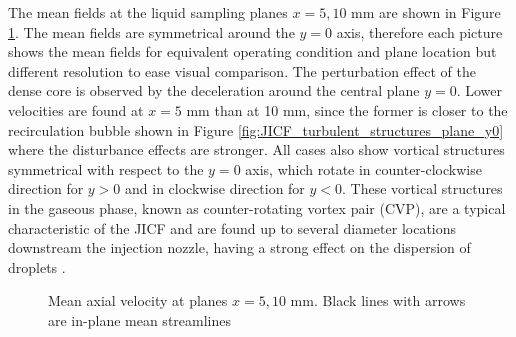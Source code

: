 The mean fields at the liquid sampling planes $x = 5, 10$ mm are shown in Figure \ref{fig:JICF_turbulent_structures_planes_x}. The mean fields are symmetrical around the $y = 0$ axis, therefore each picture shows the mean fields for equivalent operating condition and plane location but different resolution to ease visual comparison. The perturbation effect of the dense core is observed by the deceleration around the central plane $y = 0$. Lower velocities are found at $x = 5$ mm than at 10 mm, since the former is closer to the recirculation bubble shown in Figure \ref{fig:JICF_turbulent_structures_plane_y0} where the disturbance effects are stronger. All cases also show vortical structures symmetrical with respect to the $y = 0$ axis, which rotate in counter-clockwise direction for $y > 0$ and in clockwise direction for  $y < 0$. These vortical structures in the gaseous phase, known as counter-rotating vortex pair (CVP), are a typical characteristic of the JICF and are found up to several diameter locations downstream the injection nozzle, having a strong effect on the dispersion of droplets . 

\begin{figure}[ht]
\centering
\caption[Mean axial velocity at planes $x = 5, 10$ mm]{Mean axial velocity at planes $x = 5, 10$ mm. Black lines with arrows are in-plane mean streamlines}
\label{fig:JICF_turbulent_structures_planes_x}
\end{figure}


